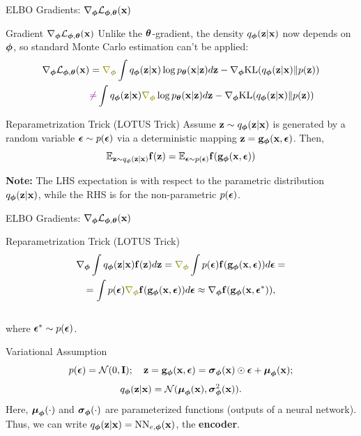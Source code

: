 \documentclass{beamer}
\renewcommand{\eqpause}{}
\renewcommand{\nextonslide}[1]{#1}
\begin{document}
\begin{frame}{ELBO Gradients: $\nabla_{\boldsymbol{\phi}} \mathcal{L}_{\boldsymbol{\phi}, \boldsymbol{\theta}}(\mathbf{x})$}
	\begin{block}{Gradient $\nabla_{\boldsymbol{\phi}} \mathcal{L}_{\boldsymbol{\phi}, \boldsymbol{\theta}}(\mathbf{x})$}
		Unlike the $\boldsymbol{\theta}$-gradient, the density $q_{\boldsymbol{\phi}}(\mathbf{z}| \mathbf{x})$ now depends on $\boldsymbol{\phi}$, so standard Monte Carlo estimation can't be applied:
		\begin{align*}
			\nabla_{\bphi} \cL_{\bphi, \btheta}(\bx) &= {\color{olive}\nabla_{\bphi}} \int q_{\bphi}(\bz| \bx)\log \pt(\bx | \bz) d \bz - \nabla_{\bphi} \KL(q_{\bphi}(\bz| \bx) \| p(\bz)) \\
			\nextonslide{& {\color{violet}\neq} \int q_{\bphi}(\bz| \bx) {\color{olive}\nabla_{\bphi}} \log \pt(\bx | \bz) d \bz - \nabla_{\bphi} \KL(q_{\bphi}(\bz| \bx) \| p(\bz))}
		\end{align*}
	\end{block}
	\eqpause
	\vspace{-0.5cm}
	\begin{block}{Reparametrization Trick (LOTUS Trick)} 
		Assume $\mathbf{z} \sim q_{\boldsymbol{\phi}}(\mathbf{z}| \mathbf{x})$ is generated by a random variable $\boldsymbol{\epsilon} \sim p(\boldsymbol{\epsilon})$ via a deterministic mapping $\mathbf{z} = \mathbf{g}_{\boldsymbol{\phi}}(\mathbf{x}, \boldsymbol{\epsilon})$. Then,
		\[
			\mathbb{E}_{\mathbf{z} \sim q_{\boldsymbol{\phi}}(\mathbf{z}| \mathbf{x})} \mathbf{f}(\mathbf{z}) = \mathbb{E}_{\boldsymbol{\epsilon} \sim p(\boldsymbol{\epsilon})} \mathbf{f}(\mathbf{g}_{\boldsymbol{\phi}}(\mathbf{x}, \boldsymbol{\epsilon}))
		\]
		\eqpause
		\textbf{Note:} The LHS expectation is with respect to the parametric distribution $q_{\boldsymbol{\phi}}(\mathbf{z}| \mathbf{x})$, while the RHS is for the non-parametric $p(\boldsymbol{\epsilon})$.
	\end{block}
\end{frame}
\begin{frame}{ELBO Gradients: $\nabla_{\boldsymbol{\phi}} \mathcal{L}_{\boldsymbol{\phi}, \boldsymbol{\theta}}(\mathbf{x})$}
	\begin{block}{Reparametrization Trick (LOTUS Trick)} 
		\vspace{-0.7cm}
		\begin{multline*}
			\nabla_{\bphi}\int q_{\bphi}(\bz| \bx) \bff(\bz) d\bz = {\color{olive}\nabla_{\bphi}} \int p(\bepsilon)  \bff(\bg_{\bphi}(\bx, \bepsilon)) d\bepsilon 
			\nextonslide{= \\ = \int p(\bepsilon) {\color{olive}\nabla_{\bphi}} \bff(\bg_{\bphi}(\bx, \bepsilon)) d\bepsilon \approx \nabla_{\bphi} \bff(\bg_{\bphi}(\bx, \bepsilon^*))},
		\end{multline*}
		\vspace{-0.5cm} \\
		where $\boldsymbol{\epsilon}^* \sim p(\boldsymbol{\epsilon})$.
	\end{block}
	\eqpause
	\begin{block}{Variational Assumption} 
		\vspace{-0.3cm}
		\[
			p(\boldsymbol{\epsilon}) = \mathcal{N}(0, \mathbf{I}); \quad \mathbf{z} = \mathbf{g}_{\boldsymbol{\phi}}(\mathbf{x}, \boldsymbol{\epsilon}) = \boldsymbol{\sigma}_{\boldsymbol{\phi}}(\mathbf{x}) \odot \boldsymbol{\epsilon} + \boldsymbol{\mu}_{\boldsymbol{\phi}}(\mathbf{x});
		\]
		\[
			q_{\boldsymbol{\phi}}(\mathbf{z}| \mathbf{x}) = \mathcal{N} (\boldsymbol{\mu}_{\boldsymbol{\phi}}(\mathbf{x}), \boldsymbol{\sigma}^2_{\boldsymbol{\phi}}(\mathbf{x})).
		\]
		Here, $\boldsymbol{\mu}_{\boldsymbol{\phi}}(\cdot)$ and $\boldsymbol{\sigma}_{\boldsymbol{\phi}}(\cdot)$ are parameterized functions (outputs of a neural network). \\
		Thus, we can write $q_{\boldsymbol{\phi}}(\mathbf{z}| \mathbf{x}) = \text{NN}_{e, \boldsymbol{\phi}}(\mathbf{x})$, the \textbf{encoder}.
	\end{block}
\end{frame}
\end{document}
